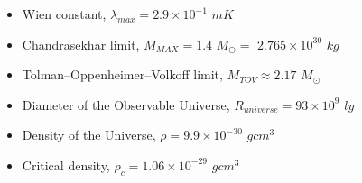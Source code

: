 \documentclass[a4paper]{IEEEtran}
\begin{document}
\begin{itemize}
  \item Wien constant, $\lambda_{max} = 2.9 \times 10^{-1}$ $mK$ \cite{tsokos}

  \item Chandrasekhar limit, $M_{MAX}=1.4$ $M_{\odot} =$ $2.765 \times 10^{30}$ $kg$ \cite{limit}

  \item Tolman–Oppenheimer–Volkoff limit, $M_{TOV} \approx 2.17$ $M_{\odot}$ \cite{tov}

  \item Diameter of the Observable Universe, $R_{universe} = 93 \times 10^9$ $ly$ \cite{size}

  \item Density of the Universe, $\rho = 9.9 \times 10^{-30}$ $g cm^3$ \cite{density}

  \item Critical density, $\rho_c = 1.06 \times 10^{-29}$ $g cm^3$ \cite{critical}
    
  \end{itemize}



\end{document}
